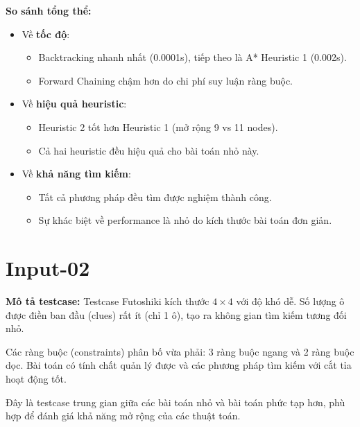 \textbf{So sánh tổng thể:}

\begin{itemize}
    \item Về \textbf{tốc độ}:
    \begin{itemize}
        \item Backtracking nhanh nhất (0.0001s), tiếp theo là A* Heuristic 1 (0.002s).
        \item Forward Chaining chậm hơn do chi phí suy luận ràng buộc.
    \end{itemize}
    
    \item Về \textbf{hiệu quả heuristic}:
    \begin{itemize}
        \item Heuristic 2 tốt hơn Heuristic 1 (mở rộng 9 vs 11 nodes).
        \item Cả hai heuristic đều hiệu quả cho bài toán nhỏ này.
    \end{itemize}
    
    \item Về \textbf{khả năng tìm kiếm}:
    \begin{itemize}
        \item Tất cả phương pháp đều tìm được nghiệm thành công.
        \item Sự khác biệt về performance là nhỏ do kích thước bài toán đơn giản.
    \end{itemize}
\end{itemize}


\section{Input-02}
\textbf{Mô tả testcase:}
Testcase Futoshiki kích thước $4 \times 4$ với độ khó dễ. Số lượng ô được điền ban đầu (clues) rất ít (chỉ 1 ô), tạo ra không gian tìm kiếm tương đối nhỏ.

Các ràng buộc (constraints) phân bố vừa phải: 3 ràng buộc ngang và 2 ràng buộc dọc. Bài toán có tính chất quản lý được và các phương pháp tìm kiếm với cắt tỉa hoạt động tốt.

Đây là testcase trung gian giữa các bài toán nhỏ và bài toán phức tạp hơn, phù hợp để đánh giá khả năng mở rộng của các thuật toán.

\begin{center}
\end{center}

